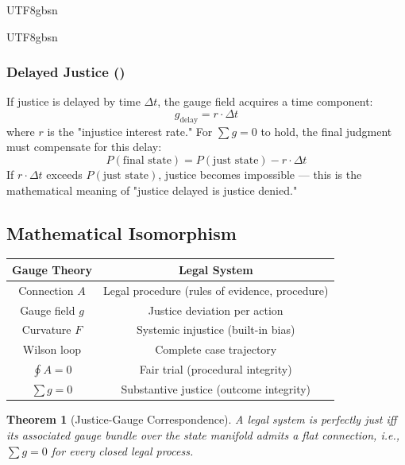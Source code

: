 \documentclass[11pt,a4paper]{article}
\newtheorem{theorem}{Theorem}[section]
\begin{document}
\begin{CJK}{UTF8}{gbsn}
{\begin{CJK}{UTF8}{gbsn}
\subsubsection{Delayed Justice ()}
If justice is delayed by time $\Delta t$, the gauge field acquires a time component:
\begin{equation}
    g_{\text{delay}} = r \cdot \Delta t
\end{equation}
where $r$ is the "injustice interest rate." For $\sum g = 0$ to hold, the final
judgment must compensate for this delay:
\begin{equation}
    P(\text{final state}) = P(\text{just state}) - r \cdot \Delta t
\end{equation}
If $r \cdot \Delta t$ exceeds $P(\text{just state})$, justice becomes impossible
--- this is the mathematical meaning of "justice delayed is justice denied."
\subsection{Mathematical Isomorphism}
\begin{center}
\begin{tabular}{c|c}
    \textbf{Gauge Theory} & \textbf{Legal System} \\
    \hline
    Connection $A$ & Legal procedure (rules of evidence, procedure) \\
    Gauge field $g$ & Justice deviation per action \\
    Curvature $F$ & Systemic injustice (built-in bias) \\
    Wilson loop & Complete case trajectory \\
    $\oint A = 0$ & Fair trial (procedural integrity) \\
    $\sum g = 0$ & Substantive justice (outcome integrity) \\
\end{tabular}
\end{center}
\begin{theorem}[Justice-Gauge Correspondence]
A legal system is \textit{perfectly just} iff its associated gauge bundle over the state
manifold admits a flat connection, i.e., $\sum g = 0$ for every closed legal process.
\end{theorem}

\end{CJK}}
\end{CJK}
\end{document}
